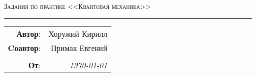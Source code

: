 
\begin{center}
    \Large \textsc{Задания по практике
     <<Квантовая механика>>
    }
\end{center}

\hrule

\phantom{42}

\begin{flushright}
    \begin{tabular}{rr}
        \textbf{Автор}: 
        & Хоружий Кирилл \\
        \textbf{Cоавтор}: 
        & Примак Евгений \\
        & \\
        \textbf{От}: &
        \textit{\today}\\
    \end{tabular}
\end{flushright}

\thispagestyle{empty}
\tableofcontents
\newpage
